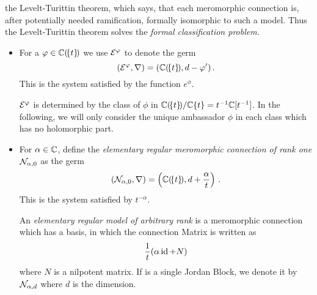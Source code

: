  the Levelt-Turittin theorem, which says,
that each meromorphic connection is, after potentially needed ramification,
formally isomorphic to such a model.
Thus the Levelt-Turittin theorem solves the \emph{formal classification
problem}.
\begin{defn}\label{defn:elemnMerConnBausteine}
  \begin{itemize}
    \item For a $\varphi\in\mathbb{C}(\!\{t\}\!)$ we use $\mathcal{E}^{\varphi}$ to denote the germ
      \[
        (\mathcal{E}^{\varphi},\nabla)=(\mathbb{C}(\!\{t\}\!),d-\varphi')\,.
      \]
      This is the system satisfied by the function $e^\phi$.
      \begin{s-cor}
        $\mathcal{E}^\varphi$ is determined by the class of $\phi$ in
        $\mathbb{C}(\!\{t\}\!)/\mathbb{C}\{t\}=t^{-1}\mathbb{C}[t^{-1}]$. In the following, we will
        only consider the unique ambassador $\phi$ in each class which has no
        holomorphic part.
      \end{s-cor}
    \item For $\alpha\in\mathbb{C}$, define the \emph{elementary regular meromorphic
      connection of rank one} $\mathcal{N}_{\alpha,0}$ as the germ
      \[
        (\mathcal{N}_{\alpha,0},\nabla)=\left(\mathbb{C}(\!\{t\}\!),d+\frac{\alpha}{t}\right)
        \,.
      \]
      This is the system satisfied by $t^{-\alpha}$.

      An \emph{elementary regular model of arbitrary rank} is a meromorphic
      connection which has a basis, in which the connection Matrix is written
      as
      \[
        \frac{1}{t} (\alpha\operatorname{id}+N)
      \]
      where $N$ is a nilpotent matrix.
      If  is a single Jordan Block, we denote it by
      $\mathcal{N}_{\alpha,d}$ where $d$ is the dimension.
  \end{itemize}
\end{defn}
